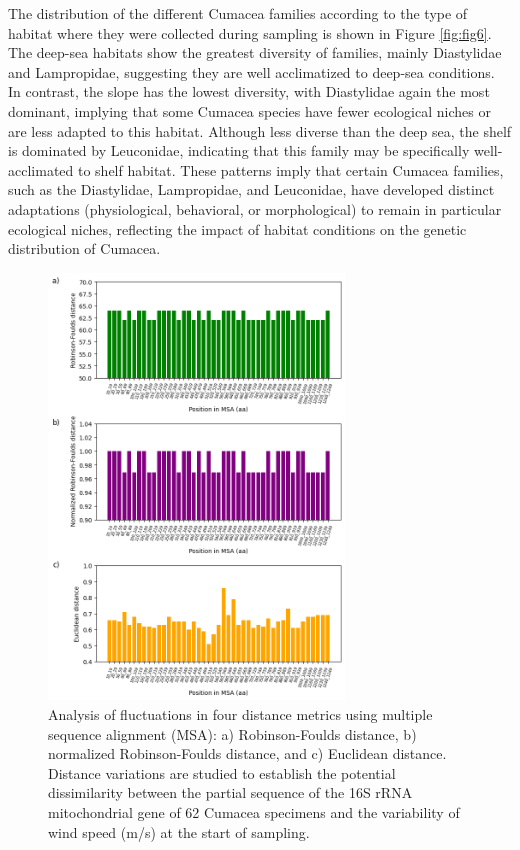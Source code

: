 {The distribution of the different Cumacea families according to the type of habitat where they were collected during sampling is shown in Figure \ref{fig:fig6}. The deep-sea habitats show the greatest diversity of families, mainly Diastylidae and Lampropidae, suggesting they are well acclimatized to deep-sea conditions. In contrast, the slope has the lowest diversity, with Diastylidae again the most dominant, implying that some Cumacea species have fewer ecological niches or are less adapted to this habitat. Although less diverse than the deep sea, the shelf is dominated by Leuconidae, indicating that this family may be specifically well-acclimated to shelf habitat. These patterns imply that certain Cumacea families, such as the Diastylidae, Lampropidae, and Leuconidae, have developed distinct adaptations (physiological, behavioral, or morphological) to remain in particular ecological niches, reflecting the impact of habitat conditions on the genetic distribution of Cumacea.

\begin{figure}[]
    \centering
    \includegraphics[width=0.7\textwidth]{figure5.png}
     \caption{Analysis of fluctuations in four distance metrics using multiple sequence alignment (MSA): a) Robinson-Foulds distance, b) normalized Robinson-Foulds distance, and c) Euclidean distance. Distance variations are studied to establish the potential dissimilarity between the partial sequence of the 16S rRNA mitochondrial gene of 62 Cumacea specimens and the variability of wind speed (m/s) at the start of sampling. \label{fig:fig7}}
\end{figure}

}

